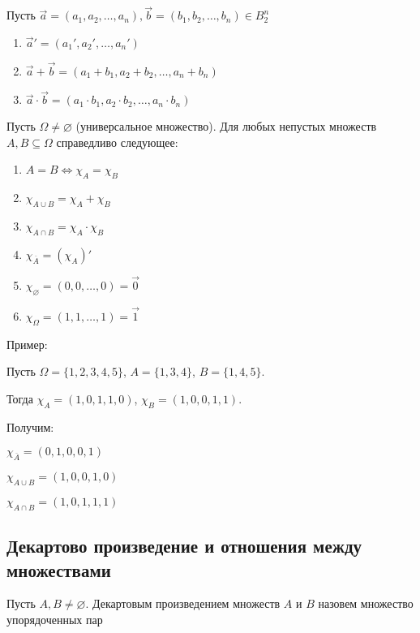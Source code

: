 Пусть $\vec{a} = (a_1, a_2, \dots, a_n), \vec{b} = (b_1, b_2, \dots, b_n) 
\in B_2^n$

\begin{enumerate}
    \item $\vec{a}' = (a_1', a_2', \dots, a_n')$
    \item $\vec{a} + \vec{b} = (a_1 + b_1, a_2 + b_2, \dots, a_n + b_n )$
    \item $\vec{a} \cdot \vec{b} = (a_1 \cdot b_1, a_2 \cdot b_2, \dots, a_n \cdot b_n)$
\end{enumerate}

\begin{theorem}
    Пусть $\Omega \neq \varnothing$ (универсальное множество).
    Для любых непустых множеств $A, B \subseteq \Omega$ справедливо следующее:
    \begin{enumerate}
        \item $A = B \iff \chi_A = \chi_B$
        \item $\chi_{A\cup B} = \chi_A + \chi_B$
        \item $\chi_{A\cap B} = \chi_A \cdot \chi_B$
        \item $\chi_{\overline{A}} = (\chi_A)'$
        \item $\chi_\varnothing = (0, 0, \dots, 0) = \vec{0}$
        \item $\chi_\Omega = (1, 1, \dots, 1) = \vec{1}$
    \end{enumerate} 
\end{theorem}

Пример:

\begin{example}
Пусть $\Omega = \{ 1, 2, 3, 4, 5\}$, $A = \{1, 3, 4\}$, $B = \{ 1, 4, 5\}$.

Тогда $\chi_A = (1, 0, 1, 1, 0)$, $\chi_B = (1, 0, 0, 1, 1)$.

Получим:

$\chi_{\overline{A}} = (0, 1, 0, 0, 1)$

$\chi_{A \cup B} = (1, 0, 0, 1, 0)$

$\chi_{A \cap B} = (1, 0, 1, 1, 1)$
\end{example}

\subsection{Декартово произведение и отношения между множествами}

Пусть $A, B \neq \varnothing$. Декартовым произведением множеств $A$ и $B$
назовем множество упорядоченных пар 

